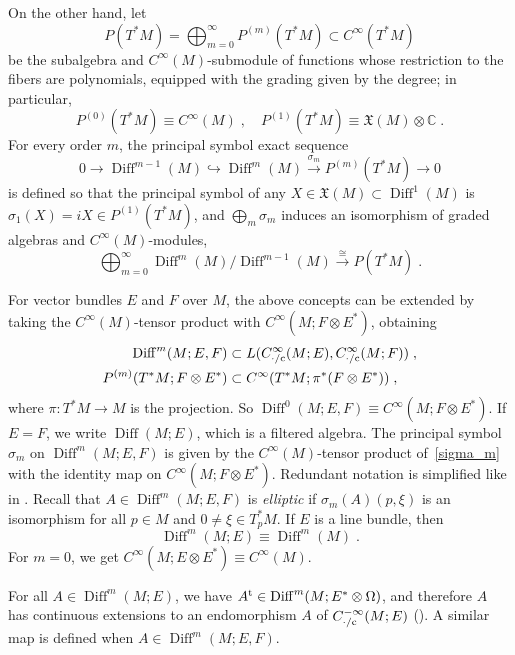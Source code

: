 \documentclass{memo-l}
\theoremstyle{plain}
\theoremstyle{definition}
\theoremstyle{remark}
\newcommand{\C}{\mathbb{C}}
\newcommand{\fX}{\mathfrak{X}}
\newcommand{\Diff}{\operatorname{Diff}}
\newcommand{\co}{{\text{\rm c}}}
\newcommand{\trans}{{\text{\rm t}}}
\numberwithin{section}{chapter}
\numberwithin{equation}{section}%
\begin{document}
On the other hand, let 
\[
P(T^*M)=\bigoplus_{m=0}^\infty P^{(m)}(T^*M)\subset C^\infty(T^*M)
\]
be the subalgebra and $C^\infty(M)$-submodule of functions whose restriction to the fibers are  polynomials, equipped with the grading given by the degree; in particular,
\[
P^{(0)}(T^*M)\equiv C^\infty(M)\;,\quad P^{(1)}(T^*M)\equiv\fX(M)\otimes\C\;. 
\]
For every order $m$, the principal symbol exact sequence
\begin{equation}\label{sigma_m}
0\to\Diff^{m-1}(M)\hookrightarrow\Diff^m(M) \xrightarrow{\sigma_m} P^{(m)}(T^*M)\to0
\end{equation}
is defined so that the principal symbol of any $X\in\fX(M)\subset\Diff^1(M)$ is $\sigma_1(X)=iX\in P^{(1)}(T^*M)$, and $\bigoplus_m\sigma_m$ induces an isomorphism of graded algebras and $C^\infty(M)$-modules,
\[
\bigoplus_{m=0}^\infty\Diff^m(M)/\Diff^{m-1}(M)\xrightarrow{\cong} P(T^*M)\;.
\]

 For vector bundles $E$ and $F$ over $M$, the above concepts can be extended by taking the $C^\infty(M)$-tensor product with $C^\infty(M;F\otimes E^*)$, obtaining
\begin{align*}
\Diff^m(M;E,F)&\subset L(C^\infty_{{\cdot}/\co}(M;E),C^\infty_{{\cdot}/\co}(M;F))\;,\\
P^{(m)}(T^*M;F\otimes E^*)&\subset C^\infty(T^*M;\pi^*(F\otimes E^*))\;,
\end{align*}
where $\pi:T^*M\to M$ is the projection. So $\Diff^0(M;E,F)\equiv C^\infty(M;F\otimes E^*)$. If $E=F$, we write $\Diff(M;E)$, which is a filtered algebra. The principal symbol $\sigma_m$ on $\Diff^m(M;E,F)$ \index{$\Diff^m(M;E,F)$} is given by the $C^\infty(M)$-tensor product of~\eqref{sigma_m} with the identity map on $C^\infty(M;F\otimes E^*)$. Redundant notation is simplified like in . Recall that $A\in\Diff^m(M;E,F)$ is \emph{elliptic} if $\sigma_m(A)(p,\xi)$ is an isomorphism for all $p\in M$ and $0\ne\xi\in T^*_pM$.  If $E$ is a line bundle, then \cite[Eq.~(2.13)]{AlvKordyLeichtnam-conormal}
\begin{equation}\label{Diff^m(M E) equiv Diff^m(M)}
\Diff^m(M;E)\equiv\Diff^m(M)\;.
\end{equation}
For $m=0$, we get $C^\infty(M;E\otimes E^*)\equiv C^\infty(M)$.

For all $A\in\Diff^m(M;E)$, we have $A^\trans\in\Diff^m(M;E^*\otimes\Omega)$, and therefore $A$ has continuous extensions to an endomorphism $A$ of $C^{-\infty}_{{\cdot}/\co}(M;E)$ (). A similar map is defined when $A\in\Diff^m(M;E,F)$.
\end{document}
